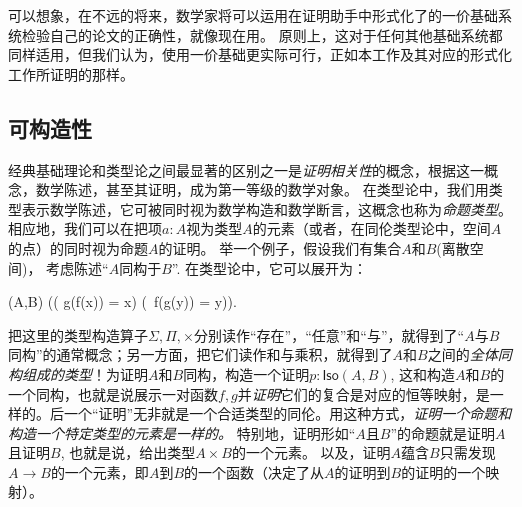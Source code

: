 可以想象，在不远的将来，数学家将可以运用在证明助手中形式化了的一价基础系统检验自己的论文的正确性，就像现在用。
原则上，这对于任何其他基础系统都同样适用，但我们认为，使用一价基础更实际可行，正如本工作及其对应的形式化工作所证明的那样。

%
%
%
%

\subsection*{可构造性} 

%

经典基础理论和类型论之间最显著的区别之一是\emph{证明相关性}的概念，根据这一概念，数学陈述，甚至其证明，成为第一等级的数学对象。
在类型论中，我们用类型表示数学陈述，它可被同时视为数学构造和数学断言，这概念也称为\emph{命题类型}。
%
相应地，我们可以在把项$a : A$视为类型$A$的元素（或者，在同伦类型论中，空间$A$的点）的同时视为命题$A$的证明。
举一个例子，假设我们有集合$A$和$B$(离散空间)，
%
考虑陈述“$A$同构于$B$”. 在类型论中，它可以展开为：
\begin{narrowmultline*}
  (A,B)  \narrowbreak
  \Big(\big( g(f(x)) = x\big) \times \big(\, f(g(y)) = y\big)\Big).
\end{narrowmultline*}
%
把这里的类型构造算子$\Sigma, \Pi, \times$分别读作“存在”，“任意”和“与”，就得到了“$A$与$B$同构”的通常概念；另一方面，把它们读作和与乘积，就得到了$A$和$B$之间的\emph{全体同构组成的类型}！为证明$A$和$B$同构，构造一个证明$p : \mathsf{Iso}(A,B)$, 这和构造$A$和$B$的一个同构，也就是说展示一对函数$f, g$并\emph{证明}它们的复合是对应的恒等映射，是一样的。后一个“证明”无非就是一个合适类型的同伦。用这种方式，\emph{证明一个命题和构造一个特定类型的元素是一样的。}
特别地，证明形如“$A$且$B$”的命题就是证明$A$且证明$B$, 也就是说，给出类型$A\times B$的一个元素。
以及，证明$A$蕴含$B$只需发现$A \to B$的一个元素，即$A$到$B$的一个函数（决定了从$A$的证明到$B$的证明的一个映射）。

